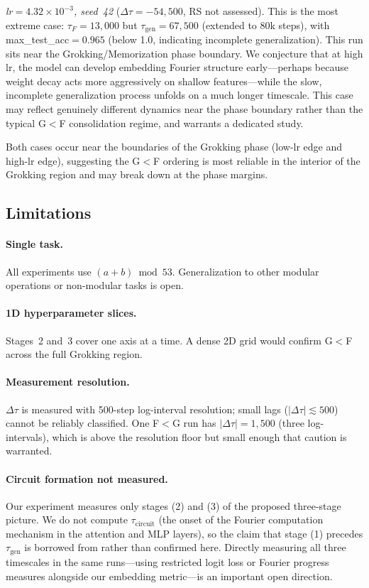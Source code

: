 \documentclass{article}
\newcommand{\taug}{\tau_{\mathrm{gen}}}
\newcommand{\tauf}{\tau_{F}}
\newcommand{\Dtau}{\Delta\tau}
\begin{document}
\textit{lr$=4.32\!\times\!10^{-3}$, seed~42} ($\Dtau=-54{,}500$,
RS not assessed).
This is the most extreme case: $\tauf=13{,}000$ but
$\taug=67{,}500$ (extended to 80k steps), with
max\_test\_acc$=0.965$ (below 1.0, indicating incomplete
generalization).
This run sits near the Grokking/Memorization phase boundary.
We conjecture that at high lr, the model can develop embedding
Fourier structure early---perhaps because weight decay acts more
aggressively on shallow features---while the slow, incomplete
generalization process unfolds on a much longer timescale.
This case may reflect genuinely different dynamics near the phase
boundary rather than the typical G$<$F consolidation regime, and
warrants a dedicated study.

Both cases occur near the boundaries of the Grokking phase
(low-lr edge and high-lr edge), suggesting the G$<$F ordering
is most reliable in the interior of the Grokking region
and may break down at the phase margins.

\subsection{Limitations}
\label{sec:limitations}

\paragraph{Single task.}
All experiments use $(a+b)\bmod 53$.
Generalization to other modular operations or non-modular tasks is open.

\paragraph{1D hyperparameter slices.}
Stages~2 and~3 cover one axis at a time.
A dense 2D grid would confirm G$<$F across the full Grokking region.

\paragraph{Measurement resolution.}
$\Dtau$ is measured with 500-step log-interval resolution;
small lags ($|\Dtau|\lesssim500$) cannot be reliably classified.
One F$<$G run has $|\Dtau|=1{,}500$ (three log-intervals),
which is above the resolution floor but small enough that caution
is warranted.

\paragraph{Circuit formation not measured.}
Our experiment measures only stages (2) and (3) of the proposed
three-stage picture.
We do not compute $\tau_{\text{circuit}}$ (the onset of the Fourier
computation mechanism in the attention and MLP layers), so the
claim that stage (1) precedes $\taug$ is borrowed from
\citet{nanda2023progress} rather than confirmed here.
Directly measuring all three timescales in the same runs---using
restricted logit loss or Fourier progress measures alongside our
embedding metric---is an important open direction.
\end{document}
